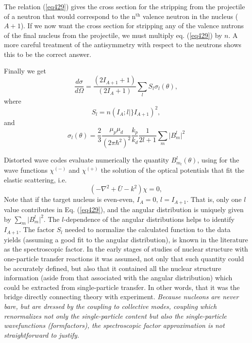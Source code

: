 The relation (\ref{eq429}) gives the cross section for the stripping from the projectile of a neutron that would correspond to the n$^{\mathrm{th}}$ valence neutron in the nucleus ($A+1$). If we now want the cross section for stripping any of the valence nutrons of the final nucleus from the projectile, we must multiply eq. (\ref{eq429}) by $n$. A more careful treatment of the antisymmetry with respect to the neutrons shows this to be the correct answer.


Finally we get
\begin{equation}\label{eq432}
\frac{d \sigma}{d \Omega}=\frac{(2I_{A+1}+1)}{(2I_A+1)} \sum_l S_l \sigma_l(\theta),
\end{equation}
where
\begin{equation}\label{eq433}
S_l= n (I_A;l \vert \} I_{A+1})^2,
\end{equation}
and
\begin{equation}\label{eq434}
\sigma_l(\theta)=\frac{2}{3} \frac{\mu_p \mu_d}{(2\pi \hbar^2)^2}
\frac{k_p}{k_d}\frac{1}{2l+1}\sum_{m} \vert B_{m}^l\vert^2
\end{equation}


Distorted wave codes evaluate numerically  the quantity $B_{m_l}^l(\theta)$, using for the wave functions $\chi^{(-)}$ and $\chi^{(+)}$ the solution of the optical potentials that fit the elastic scattering, i.e.
\begin{equation}\label{eq435}
(-\nabla ^2+\bar U-k^2) \chi=0,
\end{equation}
Note that if the target nucleus is even-even, $I_A=0$,  $l=I_{A+1}$. That is, only one $l$ value contributes in Eq. (\ref{eq429}), and the angular distribution is uniquely given by $\sum_{m} \vert B_{m}^l\vert^2$. The $l$-dependence of the angular distributions helps to identify $I_{A+1}$. The factor $S_l$ needed to normalize the calculated function to the data yields (assuming a good fit to the angular distribution), is known in the literature as the spectroscopic factor. In the early stages of studies of nuclear structure with one-particle transfer reactions it was assumed, not only that such quantity could be accurately defined, but also that it contained all the nuclear structure information (aside from that associated with the angular distribution) which could be extracted from single-particle transfer. In other words, that it was the bridge directly connecting theory with experiment. \emph{Because nucleons are never bare, but are dressed by the coupling to collective modes, coupling which renormalizes not only the single-particle content but also the single-particle wavefunctions (formfactors),   the spectroscopic factor approximation is not straightforward to justify.}



